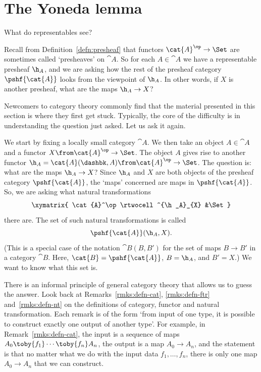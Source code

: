 \section{The Yoneda lemma}


What do representables see?

Recall from Definition~\ref{defn:presheaf} that functors $\cat{A}^\op \to
\Set$ are sometimes called `presheaves' on $\cat{A}$.  So for each $A \in
\cat{A}$ we have a representable presheaf $\h_A$, and we are asking how the
rest of the presheaf category $\pshf{\cat{A}}$ looks from the viewpoint of
$\h_A$.  In other words, if $X$ is another presheaf, what are the maps
$\h_A \to X$?

Newcomers to category theory commonly find that the material presented in
this section is where they first get stuck.  Typically, the core of the
difficulty is in understanding the question just asked.  Let us ask it
again. 

We start by fixing a locally small category $\cat{A}$.  We then take an
object $A \in \cat{A}$ and a functor $X\from \cat{A}^\op \to \Set$.  The
object $A$ gives rise to another functor $\h_A = \cat{A}(\dashbk, A)\from
\cat{A}^\op \to \Set$.  The question is: what are the maps $\h_A \to X$?
Since $\h_A$ and $X$ are both objects of the presheaf category
$\pshf{\cat{A}}$, the `maps' concerned are maps in $\pshf{\cat{A}}$.  So,
we are asking what natural transformations
% 
\begin{equation}        
\label{eq:yoneda-transf}
\begin{array}{c}
\xymatrix{
\cat{A}^\op \rtwocell^{\h_A}_{X} &\Set
}
\end{array}
\end{equation}
% 
there are.  The set of such natural transformations is called
\[
\pshf{\cat{A}}(\h_A, X).
\]
(This is a special case of the notation $\cat{B}(B, B')$ for the set of
maps $B \to B'$ in a category $\cat{B}$.  Here, $\cat{B} = \pshf{\cat{A}}$,
$B = \h_A$, and $B' = X$.)  We want to know what this set is.

There is an informal principle%
%
%
of general category theory that allows us to
guess the answer.  Look back at
Remarks~\ref{rmks:defn-cat},
\ref{rmks:defn-ftr}
and~\ref{rmks:defn-nt} on the definitions of
category, functor and natural transformation.  Each remark is of the form
`from input of one type, it is possible to construct exactly one output of
another type'.  For example, in
Remark~\ref{rmks:defn-cat}, the input is a
sequence of maps $A_0 \toby{f_1} \cdots \toby{f_n} A_n$, the output is a
map $A_0 \to A_n$, and the statement is that no matter what we do with the
input data $f_1, \ldots, f_n$, there is only one map $A_0 \to A_n$ that we
can construct.

